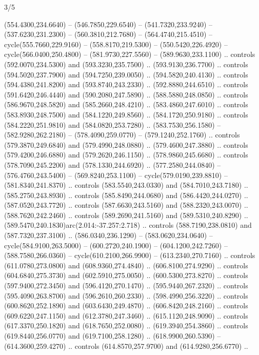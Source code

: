 \begin{flagdescription}{3/5}
\begin{scope} [xshift=0.5\flagwidth*\stretchfactor,yshift=0.5\flagwidth,scale=\flagwidth/391]
\begin{scope}[y=0.8pt, x=0.8pt, yscale=-1, xscale=1,line width=0.01\lw,shift={(-98.875,-338.125)}]
\begin{scope}[cm={{0.15382,0.0,0.0,0.15382,(34.72393,273.11413)}}]
  (554.4300,234.6640) -- (546.7850,229.6540) -- (541.7320,233.9240) --
  (537.6230,231.2300) -- (560.3810,212.7680) -- (564.4740,215.4510) --
  cycle(555.7660,229.9160) -- (558.8170,219.5300) -- (550.5420,226.4920) --
  cycle(566.0400,250.4800) -- (581.9730,227.5560) -- (589.9630,233.1100) ..
  controls (592.0070,234.5300) and (593.3230,235.7500) .. (593.9130,236.7700) ..
  controls (594.5020,237.7900) and (594.7250,239.0050) .. (594.5820,240.4130) ..
  controls (594.4380,241.8200) and (593.8740,243.2330) .. (592.8880,244.6510) ..
  controls (591.6420,246.4440) and (590.2080,247.5890) .. (588.5880,248.0850) ..
  controls (586.9670,248.5820) and (585.2660,248.4210) .. (583.4860,247.6010) ..
  controls (583.8930,248.7500) and (584.1220,249.8560) .. (584.1720,250.9180) ..
  controls (584.2220,251.9810) and (584.0820,253.7280) .. (583.7530,256.1580) --
  (582.9280,262.2180) -- (578.4090,259.0770) -- (579.1240,252.1760) .. controls
  (579.3870,249.6840) and (579.4990,248.0880) .. (579.4600,247.3880) .. controls
  (579.4200,246.6880) and (579.2620,246.1150) .. (578.9860,245.6680) .. controls
  (578.7090,245.2200) and (578.1330,244.6920) .. (577.2580,244.0840) --
  (576.4760,243.5400) -- (569.8240,253.1100) -- cycle(579.0190,239.8810) --
  (581.8340,241.8370) .. controls (583.5540,243.0330) and (584.7010,243.7180) ..
  (585.2750,243.8930) .. controls (585.8490,244.0680) and (586.4420,244.0270) ..
  (587.0520,243.7720) .. controls (587.6630,243.5160) and (588.2320,243.0070) ..
  (588.7620,242.2460) .. controls (589.2690,241.5160) and (589.5310,240.8290) ..
  (589.5470,240.1830)arc(2.014:-37.257:2.718) .. controls (588.7190,238.0810)
  and (587.7320,237.3100) .. (586.0340,236.1290) -- (583.0620,234.0640) --
  cycle(584.9100,263.5000) -- (600.2720,240.1900) -- (604.1200,242.7260) --
  (588.7580,266.0360) -- cycle(610.2100,266.9900) -- (613.2340,270.7160) ..
  controls (611.0780,273.0800) and (608.9360,274.4840) .. (606.8100,274.9290) ..
  controls (604.6840,275.3730) and (602.5910,275.0050) .. (600.5300,273.8270) ..
  controls (597.9400,272.3450) and (596.4120,270.1470) .. (595.9440,267.2320) ..
  controls (595.4090,263.8700) and (596.2610,260.2330) .. (598.4990,256.3220) ..
  controls (600.8620,252.1890) and (603.6430,249.4870) .. (606.8420,248.2160) ..
  controls (609.6220,247.1150) and (612.3780,247.3460) .. (615.1120,248.9090) ..
  controls (617.3370,250.1820) and (618.7650,252.0080) .. (619.3940,254.3860) ..
  controls (619.8440,256.0770) and (619.7100,258.1280) .. (618.9900,260.5390) --
  (614.3600,259.4270) .. controls (614.8570,257.9700) and (614.9280,256.6770) ..

\end{scope}
\end{scope}
\end{scope}
\end{flagdescription}
